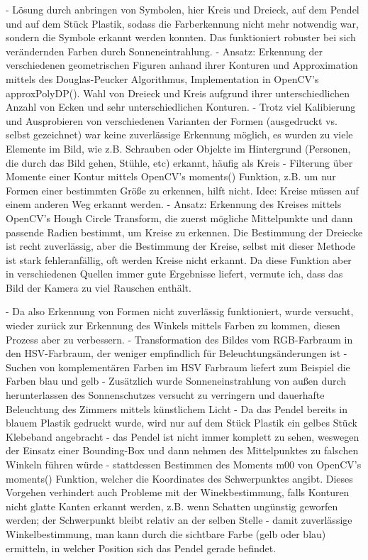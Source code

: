 - Lösung durch anbringen von Symbolen, hier Kreis und Dreieck, auf dem Pendel und auf dem Stück Plastik, sodass die Farberkennung nicht mehr notwendig war, sondern die Symbole erkannt werden konnten. Das funktioniert robuster bei sich verändernden Farben durch Sonneneintrahlung.
- Ansatz: Erkennung der verschiedenen geometrischen Figuren anhand ihrer Konturen und Approximation mittels des Douglas-Peucker Algorithmus, Implementation in OpenCV's approxPolyDP(). Wahl von Dreieck und Kreis aufgrund ihrer unterschiedlichen Anzahl von Ecken und sehr unterschiedlichen Konturen.
- Trotz viel Kalibierung und Ausprobieren von verschiedenen Varianten der Formen (ausgedruckt vs. selbst gezeichnet) war keine zuverlässige Erkennung möglich, es wurden zu viele Elemente im Bild, wie z.B. Schrauben oder Objekte im Hintergrund (Personen, die durch das Bild gehen, Stühle, etc) erkannt, häufig als Kreis
- Filterung über Momente einer Kontur mittels OpenCV's moments() Funktion, z.B. um nur Formen einer bestimmten Größe zu erkennen, hilft nicht. Idee: Kreise müssen auf einem anderen Weg erkannt werden.
- Ansatz: Erkennung des Kreises mittels OpenCV's Hough Circle Transform, die zuerst mögliche Mittelpunkte und dann passende Radien bestimmt, um Kreise zu erkennen. Die Bestimmung der Dreiecke ist recht zuverlässig, aber die Bestimmung der Kreise, selbst mit dieser Methode ist stark fehleranfällig, oft werden Kreise nicht erkannt. Da diese Funktion aber in verschiedenen Quellen immer gute Ergebnisse liefert, vermute ich, dass das Bild der Kamera zu viel Rauschen enthält. 

- Da also Erkennung von Formen nicht zuverlässig funktioniert, wurde versucht, wieder zurück zur Erkennung des Winkels mittels Farben zu kommen, diesen Prozess aber zu verbessern.
- Transformation des Bildes vom RGB-Farbraum in den HSV-Farbraum, der weniger empfindlich für Beleuchtungsänderungen ist
- Suchen von komplementären Farben im HSV Farbraum liefert zum Beispiel die Farben blau und gelb
- Zusätzlich wurde Sonneneinstrahlung von außen durch herunterlassen des Sonnenschutzes versucht zu verringern und dauerhafte Beleuchtung des Zimmers mittels künstlichem Licht 
- Da das Pendel bereits in blauem Plastik gedruckt wurde, wird nur auf dem Stück Plastik ein gelbes Stück Klebeband angebracht
- das Pendel ist nicht immer komplett zu sehen, weswegen der Einsatz einer Bounding-Box und dann nehmen des Mittelpunktes zu falschen Winkeln führen würde
- stattdessen Bestimmen des Moments m00 von OpenCV's moments() Funktion, welcher die Koordinates des Schwerpunktes angibt. Dieses Vorgehen verhindert auch Probleme mit der Winekbestimmung, falls Konturen nicht glatte Kanten erkannt werden, z.B. wenn Schatten ungünstig geworfen werden; der Schwerpunkt bleibt relativ an der selben Stelle
- damit zuverlässige Winkelbestimmung, man kann durch die sichtbare Farbe (gelb oder blau) ermitteln, in welcher Position sich das Pendel gerade befindet.

